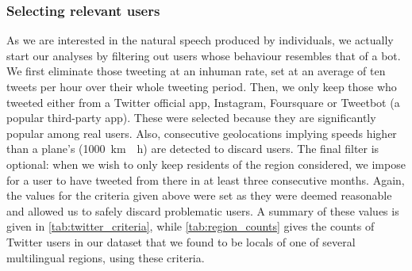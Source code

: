 \documentclass[../thesis.tex]{subfiles}
\begin{document}
\subsubsection{Selecting relevant users}
\label{sec:method_users_select}
As we are interested in the natural speech produced by individuals, we actually start
our analyses by filtering out users whose behaviour resembles that of a bot. We first
eliminate those tweeting at an inhuman rate, set at an average of ten tweets per hour
over their whole tweeting period. Then, we only keep those who tweeted either from a
Twitter official app, Instagram, Foursquare or Tweetbot (a popular third-party app).
These were selected because they are significantly popular among real users. Also,
consecutive geolocations implying speeds higher than a plane's (\SI{1000}{\kilo \meter
\per \hour}) are detected to discard users. The final filter is optional: when we wish
to only keep residents of the region considered, we impose for a user to have tweeted
from there in at least three consecutive months. Again, the values for the criteria
given above were set as they were deemed reasonable and allowed us to safely discard
problematic users. A summary of these values is given in \cref{tab:twitter_criteria},
while \cref{tab:region_counts} gives the counts of Twitter users in our dataset that we
found to be locals of one of several multilingual regions, using these criteria.
\end{document}
